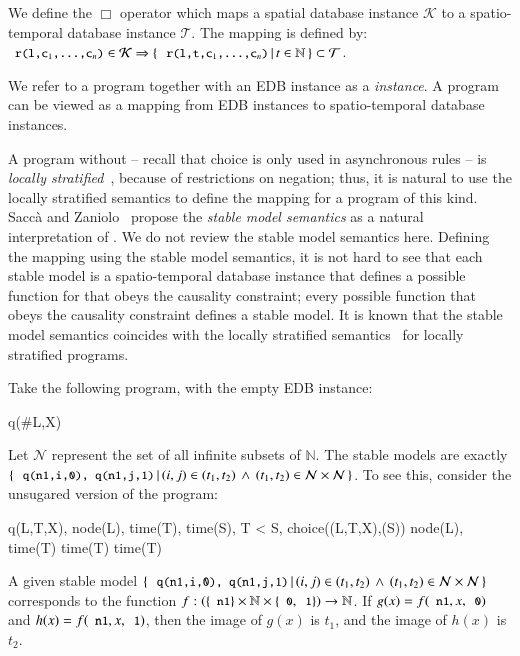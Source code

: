We define the $\Box$ operator which maps a spatial database instance $\mathcal{K}$ to a spatio-temporal database instance $\mathcal{T}$.  The mapping is defined by: $\dedalus{r(l,c\sub{1},\ldots,c\sub{n})} \in \mathcal{K} \Rightarrow \{ \, \dedalus{r(l,t,c\sub{1},\ldots,c\sub{n})} \, | \, t \in \mathbb{N} \, \} \subset \mathcal{T}$. 

We refer to a \lang program together with an EDB instance as a {\em \lang instance}.  A \lang program can be viewed as a mapping from EDB instances to spatio-temporal database instances.

A \lang program without  -- recall that choice is only used in asynchronous rules -- is {\em locally stratified}~\cite{local-strat}, because of restrictions on negation; thus, it is natural to use the locally stratified semantics to define the mapping for a \lang program of this kind.  Sacc\`{a} and Zaniolo~\cite{sacca-zaniolo} propose the {\em stable model semantics} as a natural interpretation of .  We do not review the stable model semantics here.  Defining the mapping using the stable model semantics, it is not hard to see that each stable model is a spatio-temporal database instance that defines a possible function for  that obeys the causality constraint; every possible function that obeys the causality constraint defines a stable model.  It is known that the stable model semantics coincides with the locally stratified semantics~\cite{stable-model} for locally stratified programs.

\begin{example}
\label{ex:uncountable}
Take the following \lang program, with the empty EDB instance:

\begin{Drules}
        {q(#L,X)}
\end{Drules}

Let $\mathcal{N}$ represent the set of all infinite subsets of $\mathbb{N}$.
The stable models are exactly $\{ \, \dedalus{q(n1,i,0), q(n1,j,1)} \, | \, (i,j) \in (t_1, t_2) \, \land \, (t_1, t_2) \in \mathcal{N}
\times \mathcal{N} \, \}$.  To see this, consider the unsugared version of the program:

\begin{Drules}
        {q(L,T,X), node(L), time(T), time(S), T < S, choice((L,T,X),(S))}
        {node(L), time(T)}
        {time(T)}
        {time(T)}
\end{Drules}

A given stable model $\{ \, \dedalus{q(n1,i,0), q(n1,j,1)} \, | \, (i,j)\in (t_1, t_2) \, \land \, (t_1, t_2)\in \mathcal{N}                                                    
\times \mathcal{N} \, \}$ corresponds to the function $f : \left(\{\dedalus{n1}\} \times \mathbb{N} \times \{\dedalus{0},\dedalus{1}\}\right) \rightarrow \mathbb{N}$.  If $g(x) = f(\dedalus{n1}, x, \dedalus{0})$ and $h(x) = f(\dedalus{n1}, x, \dedalus{1})$, then the image of $g(x)$ is $t_1$, and the image of $h(x)$ is $t_2$.
\end{example}

